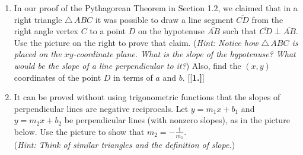{\begin{enumerate}[\bfseries 1.]
 \item In our proof of the Pythagorean Theorem in Section 1.2, we claimed that in a right
  triangle $\triangle\,ABC$ it was possible to draw a line
  segment $\overline{CD}$ from the right angle vertex $C$ to a point $D$ on the hypotenuse
  $\overline{AB}$ such that $\overline{CD} \perp \overline{AB}$.
  Use the picture on the right to prove that claim. (\emph{Hint: Notice how $\triangle\,ABC$ is
  placed on the $xy$-coordinate plane. What is the slope of the hypotenuse? What would be the slope
  of a line perpendicular to it?})
  Also, find the $(x,y)$ coordinates of the point $D$ in terms of $a$ and $b$.
[{[\bfseries 1.]}]
 \item It can be proved without using trigonometric functions that the slopes of perpendicular lines
  are negative reciprocals. Let $y = m_1{}x+b_1$ and $y = m_2{}x+b_2$ be perpendicular lines (with
  nonzero slopes), as in the picture below. Use the picture to show that
  $m_2 = -\frac{1}{m_1}$.\\(\emph{Hint: Think of similar triangles and the definition of slope.})


\end{enumerate}}
